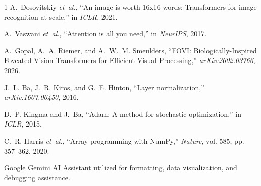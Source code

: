 \documentclass[10pt,conference]{IEEEtran}
\begin{document}
\begin{thebibliography}{1}
A.~Dosovitskiy \emph{et~al.}, ``An image is worth 16x16 words: Transformers for image recognition at scale,'' in \emph{ICLR}, 2021.

A.~Vaswani \emph{et~al.}, ``Attention is all you need,'' in \emph{NeurIPS}, 2017.

A.~Gopal, A.~A. Riemer, and A.~W.~M. Smeulders, ``FOVI: Biologically-Inspired Foveated Vision Transformers for Efficient Visual Processing,'' \emph{arXiv:2602.03766}, 2026.

J.~L. Ba, J.~R. Kiros, and G.~E. Hinton, ``Layer normalization,'' \emph{arXiv:1607.06450}, 2016.

D.~P. Kingma and J.~Ba, ``Adam: A method for stochastic optimization,'' in \emph{ICLR}, 2015.

C.~R. Harris \emph{et~al.}, ``Array programming with NumPy,'' \emph{Nature}, vol. 585, pp. 357--362, 2020.

Google Gemini AI Assistant utilized for formatting, data visualization, and debugging assistance.
\end{thebibliography}
\end{document}
